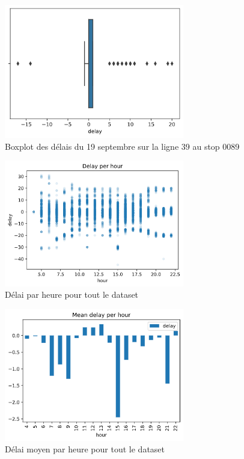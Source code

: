 \begin{appendices}
    \begin{figure}[ht]
        \centering
        \includegraphics[width=0.7\textwidth]{images/boxplot.png}
        \caption{Boxplot des délais du 19 septembre sur la ligne 39 au stop 0089}
        \label{appendix:boxplot}
    \end{figure}

    \begin{figure}[ht]
        \centering
        \includegraphics[width=0.7\textwidth]{images/delay_per_hour.png}
        \caption{Délai par heure pour tout le dataset}
        \label{appendix:delay_per_hour}
    \end{figure}

    \begin{figure}[ht]
        \centering
        \includegraphics[width=0.7\textwidth]{images/mean_delay_per_hour.png}
        \caption{Délai moyen par heure pour tout le dataset}
        \label{appendix:mean_delay_per_hour}
    \end{figure}


\end{appendices}
